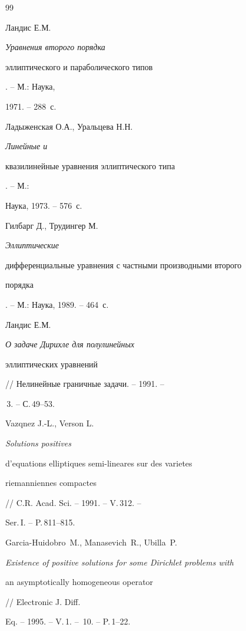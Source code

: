 \begin{thebibliography}{99}







Ландис Е.М. {\em Уравнения второго порядка


эллиптического и параболического типов}. -- М.: Наука, 


1971. -- 288~с.





 Ладыженская О.А., Уральцева Н.Н. {\em Линейные и


квазилинейные уравнения эллиптического типа}. -- М.:


Наука, 1973. -- 576~с.





 Гилбарг Д., Трудингер М. {\em Эллиптические


дифференциальные уравнения с частными производными второго


порядка}. -- М.: Наука, 1989. -- 464~с. 





 Ландис Е.М. {\em О задаче Дирихле для полулинейных


эллиптических уравнений} // Нелинейные граничные задачи. -- 1991. --


\No\,3. -- С.\,49--53. 





 Vazqnez J.-L., Verson L. {\em Solutions positives


d'equations elliptiques semi-lineares sur des varietes


riemanniennes compactes} // C.R. Acad. Sci. -- 1991. -- V.\,312. --


Ser.\,I. -- P.\,811--815.





 Garcia-Huidobro~M., Manasevich~R., Ubilla~P.


{\em Existence of positive solutions for some Dirichlet problems with 


an asymptotically homogeneous operator} // Electronic J. Diff.


Eq. -- 1995. -- V.\,1. -- \No\,10. -- P.\,1--22.






\end{thebibliography}
